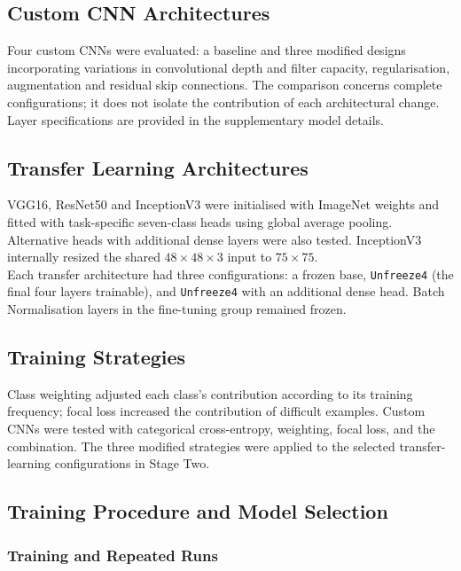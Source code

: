\documentclass[10pt, a4paper]{article}
\let\oldsubsection\subsection
\renewcommand{\subsection}{%
    \Needspace{4\baselineskip}%
    \oldsubsection
}
\let\oldsubsubsection\subsubsection
\renewcommand{\subsubsection}{%
    \Needspace{4\baselineskip}%
    \oldsubsubsection
}
\begin{document}
		\newpage
		\subsection{Custom CNN Architectures}
				
			Four custom CNNs were evaluated: a baseline and three modified designs incorporating variations in convolutional depth and filter capacity, regularisation, augmentation and residual skip connections. The comparison concerns complete configurations; it does not isolate the contribution of each architectural change. Layer specifications are provided in the supplementary model details.
				
		\subsection{Transfer Learning Architectures}
			
			VGG16, ResNet50 and InceptionV3 were initialised with ImageNet weights and fitted with task-specific seven-class heads using global average pooling. Alternative heads with additional dense layers were also tested. InceptionV3 internally resized the shared $48\times48\times3$ input to $75\times75$.\\
			Each transfer architecture had three configurations: a frozen base, \texttt{Unfreeze4} (the final four layers trainable), and \texttt{Unfreeze4} with an additional dense head. Batch Normalisation layers in the fine-tuning group remained frozen.
				
		\subsection{Training Strategies}
			
			Class weighting adjusted each class's contribution according to its training frequency; focal loss increased the contribution of difficult examples. Custom CNNs were tested with categorical cross-entropy, weighting, focal loss, and the combination. The three modified strategies were applied to the selected transfer-learning configurations in Stage Two.
				
		\subsection{Training Procedure and Model Selection}
			
			\subsubsection{Training and Repeated Runs}
			
\end{document}
